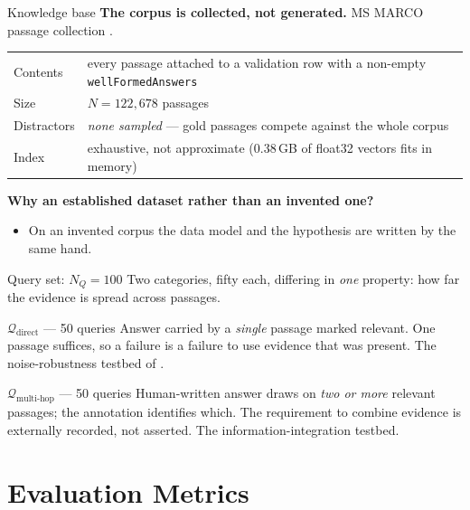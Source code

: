 \documentclass[11pt,aspectratio=169]{beamer}
\begin{document}
\begin{frame}{Knowledge base}
  \textbf{The corpus is collected, not generated.} MS MARCO passage
  collection \citep{nguyen2016msmarco}.
  \begin{center}\small
  \begin{tabular}{@{}ll@{}}
    \toprule
    Contents & every passage attached to a validation row with a non-empty \texttt{wellFormedAnswers} \\
    Size & $N = 122{,}678$ passages \\
    Distractors & \emph{none sampled} --- gold passages compete against the whole corpus \\
    Index & exhaustive, not approximate (0.38\,GB of float32 vectors fits in memory) \\
    \bottomrule
  \end{tabular}
  \end{center}
  \medskip
  \textbf{Why an established dataset rather than an invented one?}
  \begin{itemize}\small
    \item On an invented corpus the data model and the hypothesis are written
          by the same hand.
  \end{itemize}
\end{frame}

\begin{frame}{Query set: $N_Q = 100$}
  Two categories, fifty each, differing in \emph{one} property: how far the
  evidence is spread across passages.
  \begin{block}{$\mathcal{Q}_{\text{direct}}$ --- 50 queries}
    \small Answer carried by a \emph{single} passage marked relevant. One
    passage suffices, so a failure is a failure to use evidence that was
    present. The noise-robustness testbed of \citet{chen2024rgb}.
  \end{block}
  \vspace{-0.3em}
  \begin{block}{$\mathcal{Q}_{\text{multi-hop}}$ --- 50 queries}
    \small Human-written answer draws on \emph{two or more} relevant
    passages; the annotation identifies which. The requirement to combine
    evidence is externally recorded, not asserted. The
    information-integration testbed.
  \end{block}
\end{frame}

\section{Evaluation Metrics}
\end{document}
